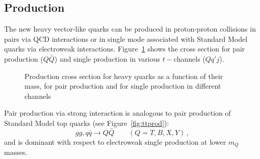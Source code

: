

\subsection{Production}\label{sec:vlqprod}

The new heavy vector-like quarks can be produced in
proton-proton collisions in pairs via QCD interactions
or in single mode associated with Standard Model quarks
via electroweak interactions.
Figure~\ref{fig:vlqxsec} shows the cross section for
pair production ($Q\bar{Q}$) and single production 
in various $t-$channels ($Qq'j$).

\begin{figure}[hbt]\begin{center}
	\caption{Production cross section for heavy quarks as 
          a function of their mass, for pair production and
          for single production in different 
          channels~\cite{Aguilar-Saavedra:2013qpa}\label{fig:vlqxsec}}
\end{center}\end{figure}

Pair production via strong interaction is analogous to
pair production of Standard Model top quarks 
(see Figure~\ref{fig:ttprod}):
\begin{equation}
gg,q \bar q \to Q \bar Q \quad\quad (Q=T,B,X,Y) \,,
\end{equation}
and is dominant with respect to electroweak single
production at lower $m_Q$ masses. 

